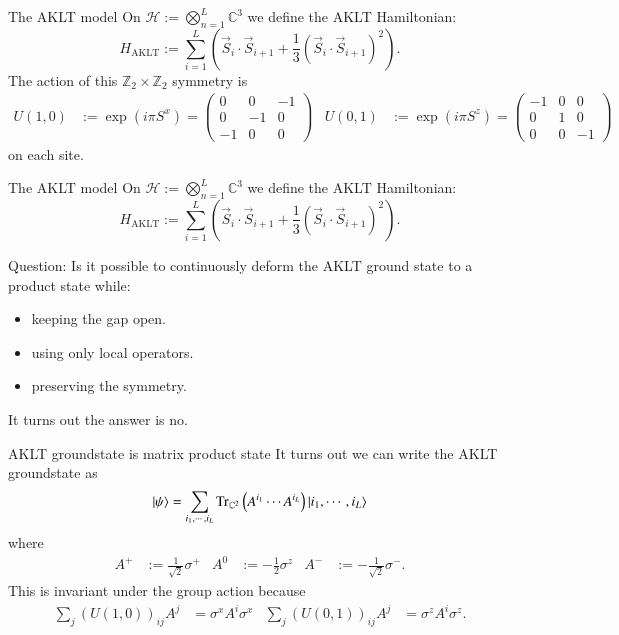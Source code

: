 \documentclass{beamer}
\newcommand{\HH}{\mathcal{H}}
\newcommand{\CC}{\mathbb{C}}
\newcommand{\ZZ}{\mathbb{Z}}
\begin{document}
\begin{frame}{The AKLT model}
On $\HH:=\bigotimes_{n=1}^L\CC^3$ we define the AKLT Hamiltonian: 
\begin{equation*}
H_{\text{AKLT}}:= \sum_{i=1}^L\left(\vec{S}_i\cdot \vec{S}_{i+1}+\frac{1}{3}(\vec{S}_i\cdot \vec{S}_{i+1})^2\right).
\end{equation*}
The action of this $\ZZ_2\times \ZZ_2$ symmetry is
\begin{align*}
U(1,0)&:=\exp(i\pi S^x)=\begin{pmatrix}0&0&-1\\0&-1&0\\-1&0&0\end{pmatrix}&U(0,1)&:=\exp(i\pi S^z)=\begin{pmatrix}-1&0&0\\0&1&0\\0&0&-1\end{pmatrix}
\end{align*}
on each site.
\end{frame}

\begin{frame}{The AKLT model}
On $\HH:=\bigotimes_{n=1}^L\CC^3$ we define the AKLT Hamiltonian: 
\begin{equation*}
H_{\text{AKLT}}:= \sum_{i=1}^L\left(\vec{S}_i\cdot \vec{S}_{i+1}+\frac{1}{3}(\vec{S}_i\cdot \vec{S}_{i+1})^2\right).
\end{equation*}
\begin{block}{Question:}
Is it possible to continuously deform the AKLT ground state to a product state while:
\begin{itemize}
\item keeping the gap open.
\item using only local operators.
\item preserving the symmetry.
\end{itemize}
\end{block}
\pause
It turns out the answer is no.
\end{frame}

\begin{frame}{AKLT groundstate is matrix product state}
It turns out we can write the AKLT groundstate as
\begin{equation*}
\ket{\psi}=\sum_{i_1,\cdots,i_L}\textrm{Tr}_{\CC^2}\left(A^{i_1}\cdots A^{i_L}\right)\ket{i_1,\cdots ,i_L}
\end{equation*}
where
\begin{align*}
A^+&:=\frac{1}{\sqrt{2}}\sigma^+&A^0&:=-\frac{1}{2}\sigma^z&A^-&:=-\frac{1}{\sqrt{2}}\sigma^-.
\end{align*}
\pause
This is invariant under the group action because
\begin{align*}
\sum_j (U(1,0) )_{ij}A^j&=\sigma^x A^i \sigma^x&\sum_j (U(0,1) )_{ij}A^j&=\sigma^z A^i \sigma^z.
\end{align*}
\end{frame}
\end{document}
